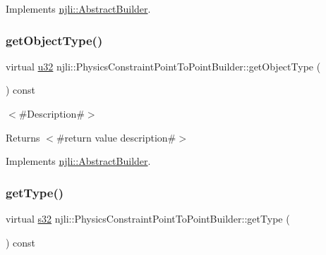 Implements \mbox{\hyperlink{classnjli_1_1_abstract_builder_a902f73ea78031b06aca183a417f3413b}{njli\+::\+Abstract\+Builder}}.

\mbox{\label{classnjli_1_1_physics_constraint_point_to_point_builder_ab135c6e1514b155704977143b1d2c358}} 
\subsubsection{\texorpdfstring{get\+Object\+Type()}{getObjectType()}}
{\footnotesize\ttfamily virtual \mbox{\hyperlink{_util_8h_a10e94b422ef0c20dcdec20d31a1f5049}{u32}} njli\+::\+Physics\+Constraint\+Point\+To\+Point\+Builder\+::get\+Object\+Type (\begin{DoxyParamCaption}{ }\end{DoxyParamCaption}) const\hspace{0.3cm}{\ttfamily [virtual]}}

$<$\#\+Description\#$>$

\begin{DoxyReturn}{Returns}
$<$\#return value description\#$>$ 
\end{DoxyReturn}


Implements \mbox{\hyperlink{classnjli_1_1_abstract_builder_a0f2d344fcf697b167f4f2b1122b5fb33}{njli\+::\+Abstract\+Builder}}.

\mbox{\label{classnjli_1_1_physics_constraint_point_to_point_builder_a75b5f5425bf6d9893de91d87eab21e24}} 
\subsubsection{\texorpdfstring{get\+Type()}{getType()}}
{\footnotesize\ttfamily virtual \mbox{\hyperlink{_util_8h_aa62c75d314a0d1f37f79c4b73b2292e2}{s32}} njli\+::\+Physics\+Constraint\+Point\+To\+Point\+Builder\+::get\+Type (\begin{DoxyParamCaption}{ }\end{DoxyParamCaption}) const\hspace{0.3cm}{\ttfamily [virtual]}}

